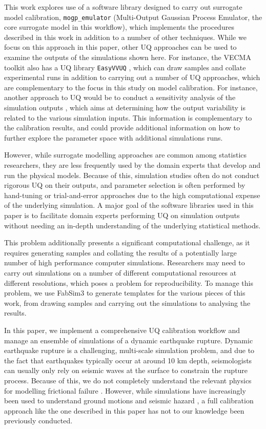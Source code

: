 \documentclass[openacc]{rstransa}%
\begin{document}
This work explores use of a software library designed to carry out surrogate model calibration,
\texttt{mogp\_emulator} (Multi-Output Gaussian Process Emulator, the core surrogate model
in this workflow), which implements the procedures described in this work in addition to a
number of other techniques. While we focus on this approach in this paper,
other UQ approaches can be used to examine the outputs of the simulations shown here.
For instance, the VECMA toolkit \cite{vecma-tk} also has a UQ library \texttt{EasyVVUQ}
\cite{easyvvuq}, which can
draw samples and collate experimental runs in addition to carrying out a number of
UQ approaches, which are complementary to the focus in this study on model calibration.
For instance, another approach to UQ would be to conduct a sensitivity analysis of the
simulation outputs \cite{sobol}, which aims at determining how the output variability is related to the
various simulation inputs. This information is complementary to the calibration results,
and could provide additional information on how to further explore the parameter space
with additional simulations runs.

However, while surrogate modelling approaches are common among statistics researchers, they are
less frequently used by the domain experts that develop and run the physical models. Because of this,
simulation studies often do not conduct rigorous UQ on their outputs, and parameter selection is
often performed by hand-tuning or trial-and-error approaches due to the high computational expense
of the underlying simulation. A major goal of the software libraries
used in this paper is to facilitate domain experts performing UQ on simulation outputs without
needing an in-depth understanding of the underlying statistical methods.

This problem additionally presents a significant computational challenge, as it requires generating samples
and collating the results of a potentially large number of high performance computer simulations.
Researchers may need to carry out simulations on a number of different computational resources at
different resolutions, which poses a problem for reproducibility. To manage this problem, we
use FabSim3 \cite{fabsim} to generate templates for the various pieces of this work, from drawing samples
and carrying out the simulations to analysing the results.

In this paper, we implement a comprehensive
UQ calibration workflow and manage an ensemble of simulations of a dynamic earthquake rupture.
Dynamic earthquake rupture is a challenging, multi-scale simulation problem, and due to the fact
that earthquakes typically occur at around 10 km depth, seismologists can usually only rely
on seismic waves at the surface to constrain the rupture process. Because of this, we do not
completely understand the relevant physics for modelling frictional failure \cite{daubcarlson}. However, while
simulations have increasingly been used to understand ground motions and seismic hazard \cite{terashake,m8}, a full
calibration approach like the one described in this paper has not to our knowledge been
previously conducted.
\end{document}
